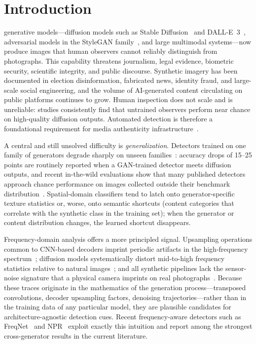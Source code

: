 \documentclass[journal]{IEEEtran}
\begin{document}
\IEEEpeerreviewmaketitle

\section{Introduction}
 generative models---diffusion models such as Stable Diffusion~\cite{rombach2022} and DALL-E~3~\cite{betker2023}, adversarial models in the StyleGAN family~\cite{karras2019}, and large multimodal systems---now produce images that human observers cannot reliably distinguish from photographs. This capability threatens journalism, legal evidence, biometric security, scientific integrity, and public discourse. Synthetic imagery has been documented in election disinformation, fabricated news, identity fraud, and large-scale social engineering, and the volume of AI-generated content circulating on public platforms continues to grow. Human inspection does not scale and is unreliable: studies consistently find that untrained observers perform near chance on high-quality diffusion outputs. Automated detection is therefore a foundational requirement for media authenticity infrastructure~\cite{wang2020,ojha2023,zhu2023genimage,tan2024npr}.

A central and still unsolved difficulty is \emph{generalization}. Detectors trained on one family of generators degrade sharply on unseen families~\cite{ojha2023,corvi2023,yan2025sanity}: accuracy drops of 15--25 points are routinely reported when a GAN-trained detector meets diffusion outputs, and recent in-the-wild evaluations show that many published detectors approach chance performance on images collected outside their benchmark distribution~\cite{yan2025sanity}. Spatial-domain classifiers tend to latch onto generator-specific texture statistics or, worse, onto semantic shortcuts (content categories that correlate with the synthetic class in the training set); when the generator or content distribution changes, the learned shortcut disappears.

Frequency-domain analysis offers a more principled signal. Upsampling operations common to CNN-based decoders imprint periodic artifacts in the high-frequency spectrum~\cite{zhang2019wifs,durall2020,frank2020}; diffusion models systematically distort mid-to-high frequency statistics relative to natural images~\cite{corvi2023,ricker2024}; and all synthetic pipelines lack the sensor-noise signature that a physical camera imprints on real photographs~\cite{cozzolino2019}. Because these traces originate in the mathematics of the generation process---transposed convolutions, decoder upsampling factors, denoising trajectories---rather than in the training data of any particular model, they are plausible candidates for architecture-agnostic detection cues. Recent frequency-aware detectors such as FreqNet~\cite{tan2024freqnet} and NPR~\cite{tan2024npr} exploit exactly this intuition and report among the strongest cross-generator results in the current literature.
\end{document}
